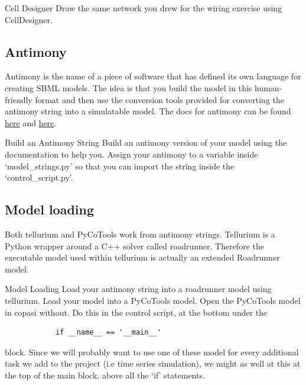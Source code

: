 \documentclass[../../main]{subfiles}
\begin{document}
    \begin{Task}[label=CellDesigner]{Cell Designer}
        Draw the same network you drew for the wiring exercise using CellDesigner.
    \end{Task}

    \subsection{Antimony}
    Antimony is the name of a piece of software that has defined its own language for creating SBML models.
    The idea is that you build the model in this human-friendly format and then use the conversion tools
    provided for converting the antimony string into a simulatable model. The docs for antimony can be
    found \href{https://tellurium.readthedocs.io/en/latest/antimony.html}{here} and \href{http://tellurium.analogmachine.org/antimony-tutorial/}{here}.

    \begin{Task}[label=AntimonyString]{Build an Antimony String}
        Build an antimony version of your model using the documentation to help you.
        Assign your antimony to a variable inside `model\_strings.py' so that you can import the
        string inside the `control\_script.py'.
    \end{Task}

    \subsection{Model loading}
    Both tellurium and PyCoTools work from antimony strings. Tellurium is a Python wrapper around
    a C++ solver called roadrunner. Therefore the executable model used within tellurium is actually
    an extended Roadrunner model.


    \begin{Task}[label=ModelLoading]{Model Loading}
        Load your antimony string into a roadrunner model using tellurium. Load your model into
        a PyCoTools model. Open the PyCoTools model in copasi without. Do this in the control script,
        at the bottom under the
        \begin{verbatim}
            if __name__ == '__main__'
        \end{verbatim} block.
        Since we will probably want to use one of these model for every additional task we add to the project (i.e
        time series simulation), we might as well at this at the top of the main block, above all the `if' statements.
    \end{Task}
\end{document}
